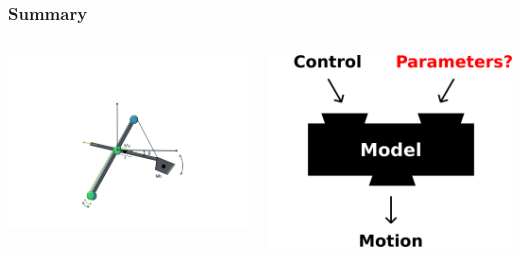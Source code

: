 \documentclass{beamer}
\begin{document}
\begin{frame}[c]
	\frametitle{Summary}

	\begin{columns}
			\includegraphics[trim=30cm 5cm 30cm 23cm, clip=true, width=\linewidth]{img/Excavator_results}
		
			\includegraphics[width=\linewidth]{img/Blackbox_4}
	\end{columns}
\end{frame}
\end{document}
